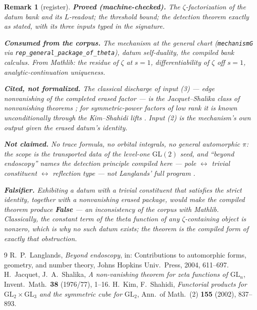 \documentclass[11pt]{article}
\newtheorem{remark}[theorem]{Remark}
\begin{document}
\begin{remark}[register]
\textbf{Proved (machine-checked).}  The $\zeta$-factorization of the datum bank and
its $L$-readout; the threshold bound; the detection theorem exactly as stated, with
its three inputs typed in the signature.

\textbf{Consumed from the corpus.}  The mechanism at the general chart
(\texttt{mechanismG} via \texttt{rep\_general\_package\_of\_theta}), datum
self-duality, the compiled bank calculus.  From Mathlib: the residue of $\zeta$ at
$s=1$, differentiability of $\zeta$ off $s=1$, analytic-continuation uniqueness.

\textbf{Cited, not formalized.}  The classical discharge of input (3) --- edge
nonvanishing of the completed erased factor --- is the Jacquet--Shalika class of
nonvanishing theorems \cite{JS}; for symmetric-power factors of low rank it is known
unconditionally through the Kim--Shahidi lifts \cite{KimShahidi}.  Input (2) is the
mechanism's own output given the erased datum's identity.

\textbf{Not claimed.}  No trace formula, no orbital integrals, no general
automorphic $\pi$: the scope is the transported data of the level-one
$\mathrm{GL}(2)$ seed, and ``beyond endoscopy'' names the \emph{detection principle}
compiled here --- pole $\leftrightarrow$ trivial constituent $\leftrightarrow$
reflection type --- not Langlands' full program \cite{Langlands}.

\textbf{Falsifier.}  Exhibiting a datum with a trivial constituent that satisfies
the strict identity, together with a nonvanishing erased package, would make the
compiled theorem produce \textbf{False} --- an inconsistency of the corpus with
Mathlib.  Classically, the constant term of the theta function of any
$\zeta$-containing object is nonzero, which is why no such datum exists; the theorem
is the compiled form of exactly that obstruction.
\end{remark}

\begin{thebibliography}{9}
 R.~P.~Langlands,
\emph{Beyond endoscopy}, in: Contributions to automorphic forms, geometry, and
number theory, Johns Hopkins Univ.\ Press, 2004, 611--697.
 H.~Jacquet, J.~A.~Shalika,
\emph{A non-vanishing theorem for zeta functions of $\mathrm{GL}_n$},
Invent.\ Math.\ \textbf{38} (1976/77), 1--16.
 H.~Kim, F.~Shahidi,
\emph{Functorial products for $\mathrm{GL}_2\times\mathrm{GL}_3$ and the symmetric
cube for $\mathrm{GL}_2$}, Ann.\ of Math.\ (2) \textbf{155} (2002), 837--893.
\end{thebibliography}
\end{document}
